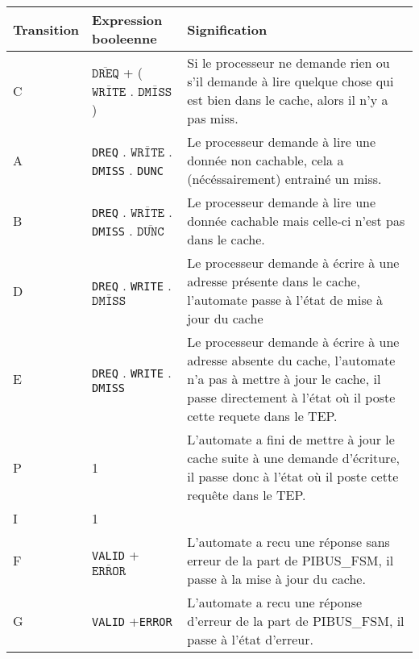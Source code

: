 \documentclass{article}
\begin{document}
\begin{table}[H]
\centering
\begingroup
\setlength{\tabcolsep}{5pt}
\renewcommand{\arraystretch}{1.1}
\begin{tabular}{| l | l | p{12cm} |}

\hline
Transition & Expression booleenne & Signification \\
\hline
\hline
C
&
$\overline{\texttt{DREQ}}$ + ($\overline{\texttt{WRITE}}$ . $\overline{\texttt{DMISS}}$)
&
Si le processeur ne demande rien ou s'il demande à lire quelque chose qui est bien
dans le cache, alors il n'y a pas miss.
\\
\hline

A
&
\texttt{DREQ} . $\overline{\texttt{WRITE}}$ . \texttt{DMISS}  . \texttt{DUNC}  
&
Le processeur demande à lire une donnée non cachable, cela a (nécéssairement) entrainé
un miss.
\\
\hline

B
&
\texttt{DREQ} . $\overline{\texttt{WRITE}}$ . \texttt{DMISS} . $\overline{\texttt{DUNC}}$
&
Le processeur demande à lire une donnée cachable mais celle-ci n'est pas dans le cache.
\\

\hline
\hline
D
&
\texttt{DREQ}  . \texttt{WRITE}  . $\overline{\texttt{DMISS}}$
&
Le processeur demande à écrire à une adresse présente dans le cache, l'automate
passe à l'état de mise à jour du cache
\\
\hline

E
&
\texttt{DREQ}  . \texttt{WRITE}  . \texttt{DMISS}
&
Le processeur demande à écrire à une adresse absente du cache, l'automate
n'a pas à mettre à jour le cache, il passe directement à l'état où il poste
cette requete dans le TEP. 
\\

\hline
P
&
1
&
L'automate a fini de mettre à jour le cache suite à une demande d'écriture,
il passe donc à l'état où il poste cette requête dans le TEP.
\\


\hline
\hline
I
&
1
&
\\
\hline

F
&
\texttt{VALID}  + $\overline{\texttt{ERROR}}$
&
L'automate a recu une réponse sans erreur de la part de PIBUS\_FSM,
il passe à la mise à jour du cache.
\\
\hline

G
&
\texttt{VALID}  +\texttt{ERROR}  
&
L'automate a recu une réponse d'erreur de la part de PIBUS\_FSM,
il passe à l'état d'erreur.
\\
\hline


\end{tabular}
\end{table}
\end{document}
